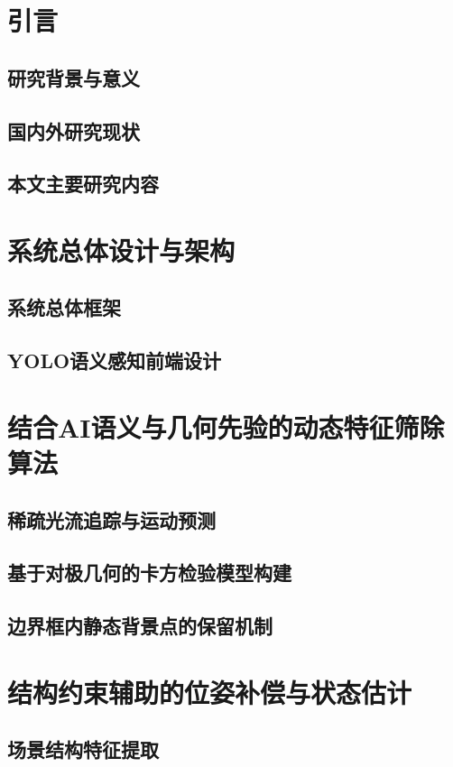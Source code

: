 \documentclass[12pt, a4paper]{ctexart}
\begin{document}
\newpage
\tableofcontents
\newpage

\section{引言}
\subsection{研究背景与意义}
\subsection{国内外研究现状}
\subsection{本文主要研究内容}

\section{系统总体设计与架构}
\subsection{系统总体框架}
\subsection{YOLO语义感知前端设计}

\section{结合AI语义与几何先验的动态特征筛除算法}
\subsection{稀疏光流追踪与运动预测}
\subsection{基于对极几何的卡方检验模型构建}
\subsection{边界框内静态背景点的保留机制}

\section{结构约束辅助的位姿补偿与状态估计}
\subsection{场景结构特征提取}
\end{document}
